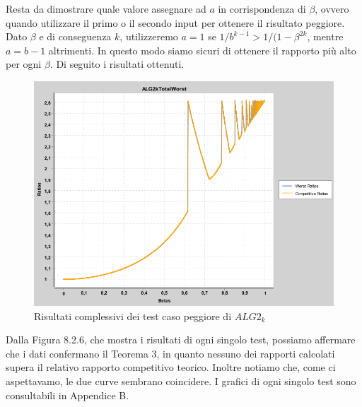 \documentclass[12pt]{article}
\begin{document}
Resta da dimostrare quale valore assegnare ad $a$ in corrispondenza di $\beta$, ovvero quando utilizzare il primo o il secondo input per ottenere il risultato peggiore. Dato $\beta$ e di conseguenza $k$, utilizzeremo $a=1$ se $1/b^{k-1} > 1/(1 - \beta^{2k}$, mentre $a = b-1$ altrimenti. In questo modo siamo sicuri di ottenere il rapporto più alto per ogni $\beta$.
Di seguito i risultati ottenuti.
\begin{figure}[H]
\caption{Risultati complessivi dei test caso peggiore di $ALG2_{k}$}
\centering
\includegraphics[scale=0.4]{worst/ALG2kTotalWorst.png}
\end{figure}

Dalla Figura 8.2.6, che mostra i risultati di ogni singolo test, possiamo affermare che i dati confermano il Teorema 3, in quanto nessuno dei rapporti calcolati supera il relativo rapporto competitivo teorico. Inoltre notiamo che, come ci aspettavamo, le due curve sembrano coincidere. I grafici di ogni singolo test sono consultabili in Appendice B.
\end{document}
